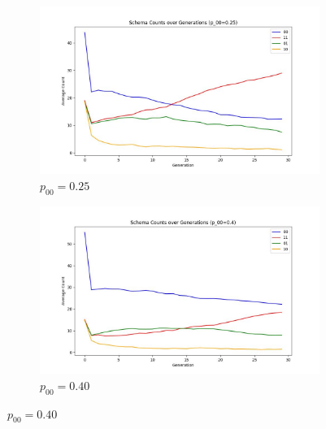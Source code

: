 \documentclass[journal=gmj]{report}%
\theoremstyle{definition}
\numberwithin{equation}{section}
\begin{document}
\begin{figure}[H]
    \centering
    \begin{subfigure}[b]{0.45\textwidth}
        \centering
        \includegraphics[width=\textwidth]{../assets/img/popnum_with_p00_0.25}
        \caption{\( p_{00} = 0.25 \)}
    \end{subfigure}
    \hfill
    \begin{subfigure}[b]{0.45\textwidth}
        \centering
        \includegraphics[width=\textwidth]{../assets/img/popnum_with_p00_0.4}
        \caption{\( p_{00} = 0.40 \)}
    \end{subfigure}
    

\end{figure}
\end{document}
